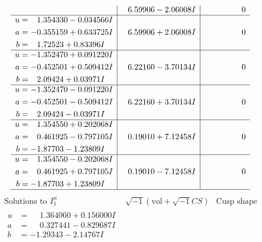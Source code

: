 \documentclass[1p]{elsarticle_modified}
\theoremstyle{definition}
\newcommand{\I}{\sqrt{-1}}
\begin{document}
$$\begin{array}{c|c|c}
 & \phantom{-}6.59906 - 2.06008 I & \phantom{-0.000000 } 0 \\ \hline\begin{aligned}
u &= \phantom{-}1.354330 - 0.034566 I \\
a &= -0.355159 + 0.633725 I \\
b &= \phantom{-}1.72523 + 0.83396 I\end{aligned}
 & \phantom{-}6.59906 + 2.06008 I & \phantom{-0.000000 } 0 \\ \hline\begin{aligned}
u &= -1.352470 + 0.091220 I \\
a &= -0.452501 + 0.509412 I \\
b &= \phantom{-}2.09424 + 0.03971 I\end{aligned}
 & \phantom{-}6.22160 - 3.70134 I & \phantom{-0.000000 } 0 \\ \hline\begin{aligned}
u &= -1.352470 - 0.091220 I \\
a &= -0.452501 - 0.509412 I \\
b &= \phantom{-}2.09424 - 0.03971 I\end{aligned}
 & \phantom{-}6.22160 + 3.70134 I & \phantom{-0.000000 } 0 \\ \hline\begin{aligned}
u &= \phantom{-}1.354550 + 0.202068 I \\
a &= \phantom{-}0.461925 - 0.797105 I \\
b &= -1.87703 - 1.23809 I\end{aligned}
 & \phantom{-}0.19010 + 7.12458 I & \phantom{-0.000000 } 0 \\ \hline\begin{aligned}
u &= \phantom{-}1.354550 - 0.202068 I \\
a &= \phantom{-}0.461925 + 0.797105 I \\
b &= -1.87703 + 1.23809 I\end{aligned}
 & \phantom{-}0.19010 - 7.12458 I & \phantom{-0.000000 } 0\\
 \hline 
 \end{array}$$\newpage$$\begin{array}{c|c|c}  
\text{Solutions to }I^u_{1}& \I (\text{vol} + \sqrt{-1}CS) & \text{Cusp shape}\\
 \hline 
\begin{aligned}
u &= \phantom{-}1.364060 + 0.156000 I \\
a &= \phantom{-}0.327441 - 0.829687 I \\
b &= -1.29343 - 2.14767 I\end{aligned}

\end{array}$$
\end{document}
